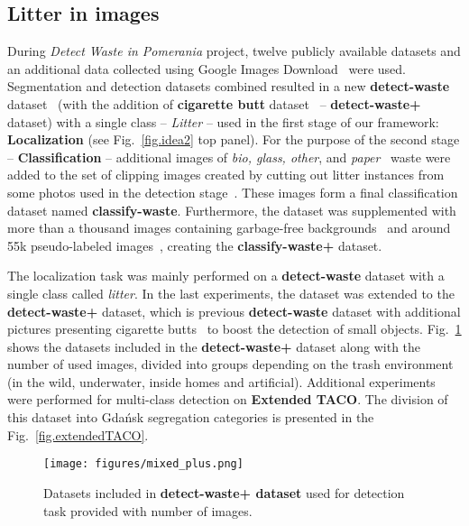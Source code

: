 \documentclass{article}
\begin{document}
 
\subsection{Litter in images}
\label{sec:datasets_collection}
During \textit{Detect Waste in Pomerania} project, twelve publicly available datasets and an additional data collected using Google Images Download~\cite{google-images-download2019} were used. Segmentation and detection datasets combined resulted in a new \textbf{detect-waste} dataset~\cite{proencca2020taco, UAVVaste2021, hong2020trashcan, ICRA2019, MJU-Waste2020, drinking_waste_classification2020, wade-ai2016} (with the addition of \textbf{cigarette butt} dataset~\cite{cigarette-butts} -- \textbf{detect-waste+} dataset) with a single class -- \textit{Litter} -- used in the first stage of our framework: \textbf{Localization} (see Fig.~\ref{fig.idea2} top panel). For the purpose of the second stage -- \textbf{Classification} -- additional images of \textit{bio, glass, other}, and \textit{paper}~\cite{TrashNet2016, waste_pictures2019, google-images-download2019} waste were added to the set of clipping images created by cutting out litter instances from some photos used in the detection stage~\cite{proencca2020taco, drinking_waste_classification2020, openlittermap2018}. These images form a final classification dataset named \textbf{classify-waste}. Furthermore, the dataset was supplemented with more than a thousand images containing garbage-free backgrounds~\cite{places} and around 55k pseudo-labeled images~\cite{openlittermap2018}, creating the \textbf{classify-waste+} dataset.

The localization task was mainly performed on a \textbf{detect-waste} dataset with a single class called \textit{litter}. In the last experiments, the dataset was extended to the \textbf{detect-waste+} dataset, which is previous \textbf{detect-waste} dataset with additional pictures presenting cigarette butts~\cite{cigarette-butts} to boost the detection of small objects. Fig.~\ref{fig.mixedDataset} shows the datasets included in the \textbf{detect-waste+} dataset along with the number of used images, divided into groups depending on the trash environment (in the wild, underwater, inside homes and artificial). Additional experiments were performed for multi-class detection on \textbf{Extended TACO}. The division of this dataset into Gdańsk segregation categories is presented in the Fig.~\ref{fig.extendedTACO}.

\begin{figure}[!ht]
\centering
  \texttt{[image: figures/mixed\_plus.png]}\caption{Datasets included in \textbf{detect-waste+ dataset} used for detection task provided with number of images.\label{fig.mixedDataset}}
\end{figure}
\end{document}
